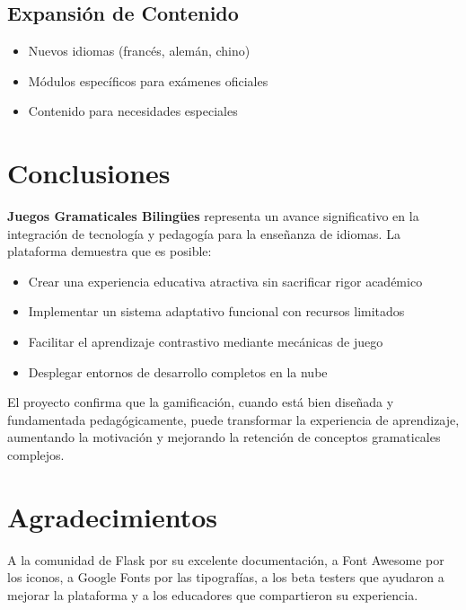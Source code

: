 \documentclass[12pt,a4paper]{article}
\begin{document}
\subsection{Expansión de Contenido}

\begin{itemize}
    \item Nuevos idiomas (francés, alemán, chino)
    \item Módulos específicos para exámenes oficiales
    \item Contenido para necesidades especiales
\end{itemize}

\section{Conclusiones}

\textbf{Juegos Gramaticales Bilingües} representa un avance significativo en la integración de tecnología y pedagogía para la enseñanza de idiomas. La plataforma demuestra que es posible:

\begin{itemize}
    \item Crear una experiencia educativa atractiva sin sacrificar rigor académico
    \item Implementar un sistema adaptativo funcional con recursos limitados
    \item Facilitar el aprendizaje contrastivo mediante mecánicas de juego
    \item Desplegar entornos de desarrollo completos en la nube
\end{itemize}

El proyecto confirma que la gamificación, cuando está bien diseñada y fundamentada pedagógicamente, puede transformar la experiencia de aprendizaje, aumentando la motivación y mejorando la retención de conceptos gramaticales complejos.

\section*{Agradecimientos}

A la comunidad de Flask por su excelente documentación, a Font Awesome por los iconos, a Google Fonts por las tipografías, a los beta testers que ayudaron a mejorar la plataforma y a los educadores que compartieron su experiencia.
\end{document}
